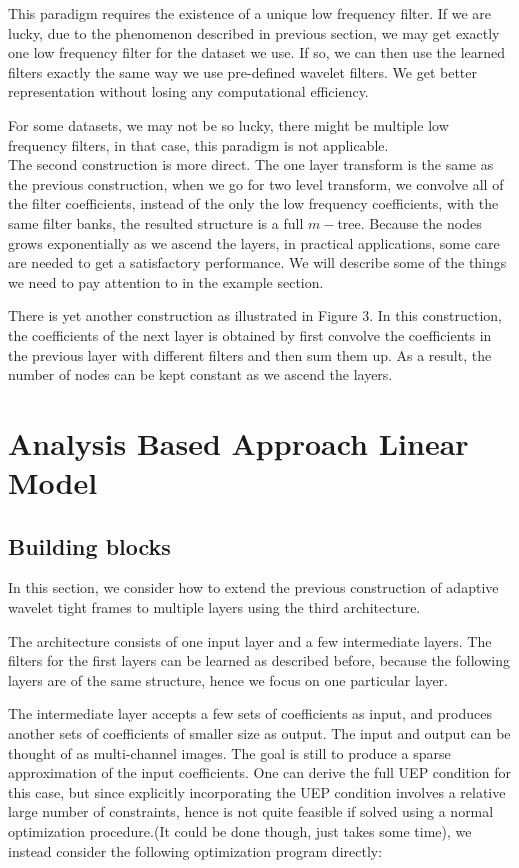 \documentclass[a4paper]{article}
\begin{document}
{This paradigm requires the existence of a unique low frequency filter. If we are lucky, due to the phenomenon described in previous section, we may get exactly one low frequency filter for the dataset we use. If so, we can then use the learned filters exactly the same way we use pre-defined wavelet filters. We get better representation without losing any computational efficiency.

For some datasets, we may not be so lucky, there might be multiple low frequency filters, in that case, this paradigm is not applicable.\\

The second construction is more direct. The one layer transform is the same as the previous construction, when we go for two level transform, we convolve all of the filter coefficients, instead of the only the low frequency coefficients, with the same filter banks, the resulted structure is a full $m-$tree. Because the nodes grows exponentially as we ascend the layers, in practical applications, some care are needed to get a satisfactory performance. We will describe some of the things we need to pay attention to in the example section.

There is yet another construction as illustrated in Figure 3. In this construction, the coefficients of the next layer is obtained by first convolve the coefficients in the previous layer with different filters and then sum them up. As a result, the number of nodes can be kept constant as we ascend the layers.
\newpage
\section{Analysis Based Approach Linear Model}
\subsection{Building blocks}
In this section, we consider how to extend the previous construction of adaptive wavelet tight frames to multiple layers using the third architecture.

The architecture consists of one input layer and a few intermediate layers. The filters for the first layers can be learned as described before, because the following layers are of the same structure, hence we focus on one particular layer. 

The intermediate layer accepts a few sets of coefficients as input, and produces another sets of coefficients of smaller size as output. The input and output can be thought of as multi-channel images. The goal is still to produce a sparse approximation of the input coefficients. One can derive the full UEP condition for this case, but since explicitly incorporating the UEP condition involves a relative large number of constraints, hence is not quite feasible if solved using a  normal optimization procedure.(It could be done though, just takes some time), we instead consider the following optimization program directly:

}
\end{document}
